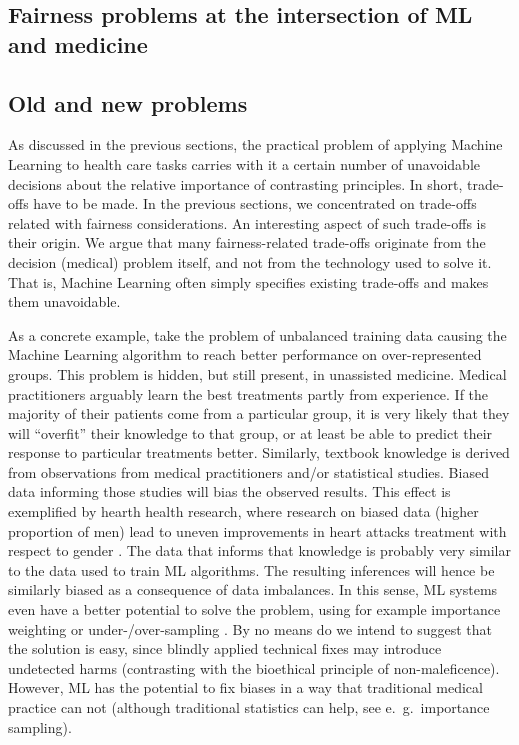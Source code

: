 \subsection{Fairness problems at the intersection of ML and medicine}



\subsection{Old and new problems}
    As discussed in the previous sections, the practical problem of applying Machine Learning to health care tasks carries with it a certain number of unavoidable decisions about the relative importance of contrasting principles.
    In short, trade-offs have to be made.
    In the previous sections, we concentrated on trade-offs related with fairness considerations.
    An interesting aspect of such trade-offs is their origin.
    We argue that many fairness-related trade-offs originate from the decision (medical) problem itself, and not from the technology used to solve it.
    That is, Machine Learning often simply specifies existing trade-offs and makes them unavoidable.

    As a concrete example, take the problem of unbalanced training data causing the Machine Learning algorithm to reach better performance on over-represented groups.
    This problem is hidden, but still present, in unassisted medicine.
    Medical practitioners arguably learn the best treatments partly from experience.
    If the majority of their patients come from a particular group, it is very likely that they will ``overfit'' their knowledge to that group, or at least be able to predict their response to particular treatments better.
    Similarly, textbook knowledge is derived from observations from medical practitioners and/or statistical studies.
    Biased data informing those studies will bias the observed results.
    This effect is exemplified by hearth health research, where research on biased data (higher proportion of men) lead to uneven improvements in heart attacks treatment with respect to gender \cite[e221]{Mccradden2020}.
    The data that informs that knowledge is probably very similar to the data used to train ML algorithms.
    The resulting inferences will hence be similarly biased as a consequence of data imbalances.
    In this sense, ML systems even have a better potential to solve the problem, using for example importance weighting or under-/over-sampling \cite[pp.~6-8]{Chen2021}.
    By no means do we intend to suggest that the solution is easy, since blindly applied technical fixes may introduce undetected harms (contrasting with the bioethical principle of non-maleficence).
    However, ML has the potential to fix biases in a way that traditional medical practice can not \cite[p.~e222]{Mccradden2020} (although traditional statistics can help, see e.~g.~importance sampling).


